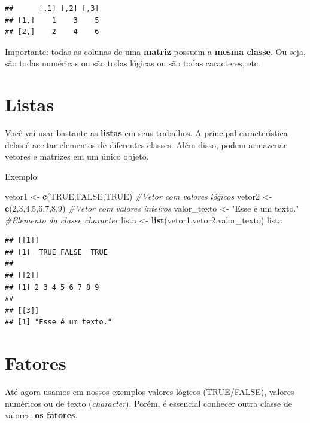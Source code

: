 \documentclass[
]{book}
\newenvironment{Shaded}{\begin{snugshade}}{\end{snugshade}}
\newcommand{\CommentTok}[1]{\textcolor[rgb]{0.56,0.35,0.01}{\textit{#1}}}
\newcommand{\DecValTok}[1]{\textcolor[rgb]{0.00,0.00,0.81}{#1}}
\newcommand{\KeywordTok}[1]{\textcolor[rgb]{0.13,0.29,0.53}{\textbf{#1}}}
\newcommand{\NormalTok}[1]{#1}
\newcommand{\OtherTok}[1]{\textcolor[rgb]{0.56,0.35,0.01}{#1}}
\newcommand{\StringTok}[1]{\textcolor[rgb]{0.31,0.60,0.02}{#1}}
\begin{document}
\begin{verbatim}
##      [,1] [,2] [,3]
## [1,]    1    3    5
## [2,]    2    4    6
\end{verbatim}

Importante: todas as colunas de uma \textbf{matriz} possuem a
\textbf{mesma classe}. Ou seja, são todas numéricas ou são todas lógicas
ou são todas caracteres, etc.

\hypertarget{listas}{%
\section{Listas}\label{listas}}

Você vai usar bastante as \textbf{listas} em seus trabalhos. A principal
característica delas é aceitar elementos de diferentes classes. Além
disso, podem armazenar vetores e matrizes em um único objeto.

Exemplo:

\begin{Shaded}
\begin{Highlighting}[]
\NormalTok{vetor1 <-}\StringTok{ }\KeywordTok{c}\NormalTok{(}\OtherTok{TRUE}\NormalTok{,}\OtherTok{FALSE}\NormalTok{,}\OtherTok{TRUE}\NormalTok{)        }\CommentTok{#Vetor com valores lógicos}
\NormalTok{vetor2 <-}\StringTok{ }\KeywordTok{c}\NormalTok{(}\DecValTok{2}\NormalTok{,}\DecValTok{3}\NormalTok{,}\DecValTok{4}\NormalTok{,}\DecValTok{5}\NormalTok{,}\DecValTok{6}\NormalTok{,}\DecValTok{7}\NormalTok{,}\DecValTok{8}\NormalTok{,}\DecValTok{9}\NormalTok{)        }\CommentTok{#Vetor com valores inteiros}
\NormalTok{valor_texto <-}\StringTok{ "Esse é um texto."}   \CommentTok{#Elemento da classe character}
\NormalTok{lista <-}\StringTok{ }\KeywordTok{list}\NormalTok{(vetor1,vetor2,valor_texto)}
\NormalTok{lista}
\end{Highlighting}
\end{Shaded}

\begin{verbatim}
## [[1]]
## [1]  TRUE FALSE  TRUE
## 
## [[2]]
## [1] 2 3 4 5 6 7 8 9
## 
## [[3]]
## [1] "Esse é um texto."
\end{verbatim}

\hypertarget{fatores}{%
\section{Fatores}\label{fatores}}

Até agora usamos em nossos exemplos valores lógicos (TRUE/FALSE),
valores numéricos ou de texto (\emph{character}). Porém, é essencial
conhecer outra classe de valores: \textbf{os fatores}.
\end{document}
